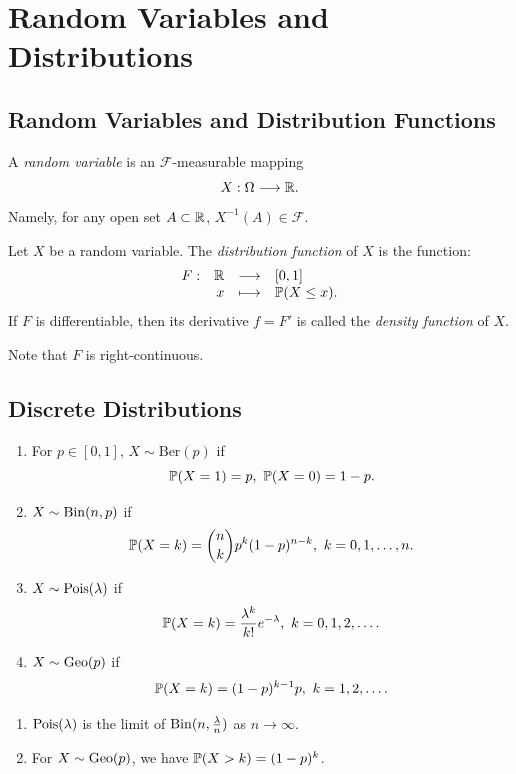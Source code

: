 \chapter{Random Variables and Distributions}

\section{Random Variables and Distribution Functions}

\begin{definitionbox}
    A \emph{random variable} is an $\mathcal{F}$-measurable mapping
    $$X : \Omega \longrightarrow \mathbb{R}.$$
    Namely, for any open set $A \subset \mathbb{R}$, $X^{-1}(A) \in \mathcal{F}$.
\end{definitionbox}

\begin{definitionbox}
    Let $X$ be a random variable.
    The \emph{distribution function} of $X$ is the function:
    $$\begin{array}{rrcl}
        F : & \mathbb{R} & \longrightarrow & [0,1] \\
        & x & \longmapsto & \mathbb{P}(X \leq x).
    \end{array}$$
    If $F$ is differentiable, then its derivative $f = F'$ is called the
    \emph{density function} of $X$.
\end{definitionbox}
\begin{remarkbox}
    Note that $F$ is right-continuous.
\end{remarkbox}

\section{Discrete Distributions}

\begin{definitionbox}
    \quad
    \begin{enumerate}
        \item For $p \in [0,1]$, $X \sim \mathrm{Ber}(p)$ if $$\mathbb{P}(X = 1) = p,\ \mathbb{P}(X = 0) = 1 - p.$$
        \item $X \sim \operatorname{\mathrm{Bin}}(n,p)$ if $$\mathbb{P}(X = k) = \binom{n}{k} p^k (1 - p)^{n-k},\ k = 0,1,\ldots,n.$$
        \item $X \sim \operatorname{\mathrm{Pois}}(\lambda)$ if $$\PP(X = k) = \frac{\lambda^k}{k!} e^{-\lambda},\ k = 0,1,2,\ldots.$$
        \item $X \sim \operatorname{\mathrm{Geo}}(p)$ if $$\mathbb{P}(X = k) = (1 - p)^{k-1} p,\ k = 1,2,\ldots.$$
    \end{enumerate}
\end{definitionbox}
\begin{remarkbox}
    \quad
    \begin{enumerate}
        \item $\operatorname{\mathrm{Pois}}(\lambda)$ is the limit of $\operatorname{\mathrm{Bin}}(n, \frac{\lambda}{n})$ as $n \to \infty$.
        \item For $X \sim \operatorname{\mathrm{Geo}}(p)$, we have $\mathbb{P}(X > k) = (1 - p)^k$.
    \end{enumerate}
\end{remarkbox}

